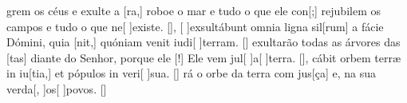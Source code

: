 {    {grem os céus e exulte a [ra,] roboe o mar e tudo o que ele con[;] rejubilem os campos e tudo o que ne[ ]{e}{xis}te. [\LinkPT]},
  {[ ]{ex}sultábunt omnia ligna sil[rum] a fácie Dómini, quia [nit,] quóniam venit iudi[ ]{ter}ram. [\LinkLA]}%
    { exultarão todas as árvores das [tas] diante do Senhor, porque ele [!] Ele vem jul[ ]{a}[ ]{ter}ra. [\LinkPT]},
  {cábit orbem terræ in iu[tia,] et pópulos in veri[ ]{su}a. [\LinkLA]}%
    {rá o orbe da terra com jus[ça] e, na sua verda[, ]{os}[ ]{po}vos. [\LinkPT]}
    
}